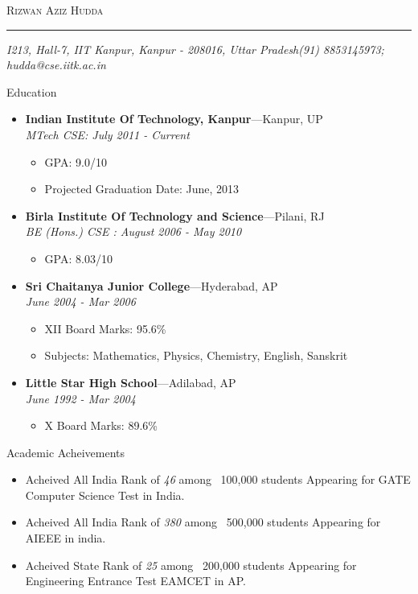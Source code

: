 \documentclass[11pt,oneside]{article}
\makeatletter
\newcommand{\name}{Rizwan Aziz Hudda}
\newcommand{\curaddr}{I213, Hall-7, IIT Kanpur, Kanpur - 208016, Uttar Pradesh}
\newcommand{\phone}{(91) 8853145973}
\newcommand{\email}{hudda@cse.iitk.ac.in}
\newcommand{\bigname}[1]{
	\begin{center}\fontfamily{phv}\selectfont\Huge\scshape#1\end{center}
}
\newenvironment{ressection}[1]{
	\vspace{4pt}
	{\fontfamily{phv}\selectfont\Large#1}
	\begin{itemize}
	\vspace{3pt}
}{
	\end{itemize}
}
\newcommand{\resitem}[1]{
	\vspace{-4pt}
	\item \begin{flushleft} #1 \end{flushleft}
}
\newcommand{\ressubitem}[1]{
	\vspace{-1pt}
	\item \begin{flushleft} #1 \end{flushleft}
}
\newcommand{\resbigitem}[3]{
	\vspace{-5pt}
	\item
	\textbf{#1}---#2 \\
	\textit{#3}
}
\newenvironment{ressubsec}[3]{
	\resbigitem{#1}{#2}{#3}
	\vspace{-2pt}
	\begin{itemize}
}{
	\end{itemize}
}
\makeatother
\begin{document}
 \selectfont

\bigname{\name}

\vspace{-8pt} \rule{\textwidth}{1pt}

\vspace{-1pt} {\small\itshape \curaddr \hfill \phone; \email}

\vspace{8 pt}




\begin{ressection}{Education}

	\begin{ressubsec}{Indian Institute Of Technology, Kanpur}{Kanpur, UP}{MTech  CSE: July 2011 - Current }
		\ressubitem{GPA: 9.0/10}
		\ressubitem{Projected Graduation Date: June, 2013}
	\end{ressubsec}
		  
	\begin{ressubsec}{Birla Institute Of Technology and Science}{Pilani, RJ}{BE (Hons.) CSE : August 2006 - May 2010 }
		\ressubitem{GPA: 8.03/10}
	\end{ressubsec}

	\begin{ressubsec}{Sri Chaitanya Junior College}{Hyderabad, AP}{June 2004 - Mar 2006}
		\ressubitem{XII Board Marks: 95.6\%}
		\ressubitem{Subjects: Mathematics, Physics, Chemistry, English, Sanskrit}
	\end{ressubsec}
	      
	\begin{ressubsec}{Little Star High School}{Adilabad, AP}{June  1992 - Mar 2004}
		\ressubitem{X Board Marks: 89.6\%}
	\end{ressubsec}
\end{ressection}


\begin{ressection}{Academic Acheivements}

	\resitem{Acheived All India Rank of \textit{46} among ~100,000 students Appearing for GATE Computer Science Test in India.}

	\resitem{Acheived All India Rank of \textit{380} among ~500,000 students Appearing for AIEEE in india.}

	\resitem{Acheived State Rank of \textit{25} among ~200,000 students Appearing for Engineering Entrance Test EAMCET in AP.}

\end{ressection}
\end{document}
